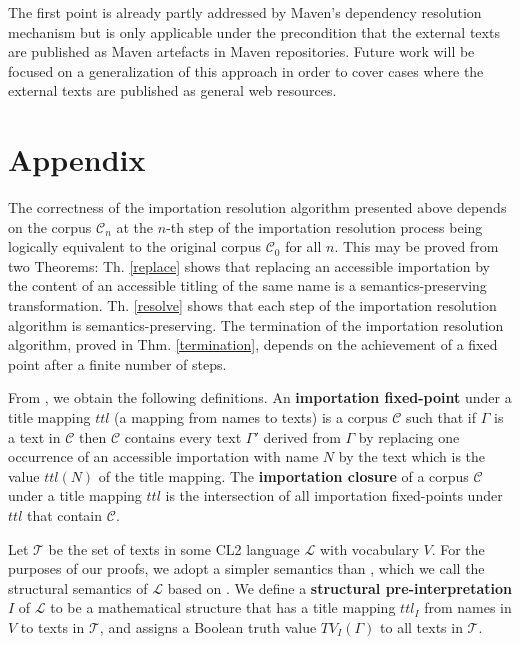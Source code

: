 \documentclass{IOS-Book-Article}
\newcommand{\corp}{ \mathcal{C} }
\newcommand{\texts}{ \mathcal{T} }
\newcommand{\lan}{ \mathcal{L} }
\newcommand{\sentstate}{ \mathcal{S} }
\newcommand{\ttl}{\mathit{ttl}}
\newcommand{\TV}{\mathit{TV}}
\begin{document}
The first point is already partly addressed by Maven's dependency resolution mechanism but is only applicable under the precondition that the external texts are published as Maven artefacts in Maven repositories.
Future work will be focused on a generalization of this approach in order to cover cases where the external texts are published as general web resources.

\appendix
\section{Appendix}
\label{appendix}
The correctness of the importation resolution algorithm presented above depends on the corpus $\corp_{n}$ at the $n$-th step of the importation resolution process being logically equivalent to the original corpus $\corp_0$ for all $n$. This may be proved from two Theorems: Th. \ref{replace} shows that replacing an accessible importation by the content of an accessible titling of the same name is a semantics-preserving transformation. Th. \ref{resolve} shows that each step of the importation resolution algorithm is semantics-preserving.
The termination of the importation resolution algorithm, proved in Thm. \ref{termination}, depends on the achievement of a fixed point after a finite number of steps.

From \cite{CDv2}, we obtain the following definitions. An \textbf{importation fixed-point} under a title mapping $\ttl$ (a mapping from names to texts) is a corpus $\corp$ such that if $\Gamma$ is a text in $\corp$ then $\corp$ contains every text $\Gamma'$ derived from $\Gamma$ by replacing one occurrence of an accessible importation with name $N$ by the text which is the value $\ttl(N)$ of the title mapping. 
The \textbf{importation closure} of a corpus $\corp$ under a title mapping $\ttl$ is the intersection of all importation fixed-points under $\ttl$ that contain $\corp$.

Let $\texts$ be the set of texts in some CL2 language $\lan$ with vocabulary $V$. 
For the purposes of our proofs, we adopt a simpler semantics  than \cite{CDv2}, which we call the structural semantics of $\lan$ based on \cite{Athan2013}.
We define a \textbf{structural pre-interpretation} $I$ of $\lan$  to be a mathematical structure that has a title mapping $\ttl_I$ from names in $V$ to texts in $\texts$, and assigns a Boolean truth value $\TV_I(\Gamma)$ to all texts in $\texts$.
\end{document}
